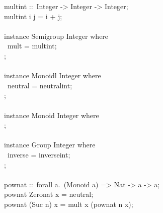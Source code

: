 \begin{isabellebody}
\begin{isamarkuptext}
\hspace*{0pt}mult{}int ::~Integer -> Integer -> Integer;\\
\hspace*{0pt}mult{}int i j = i + j;\\
\hspace*{0pt}\\
\hspace*{0pt}instance Semigroup Integer where {}\\
\hspace*{0pt} ~mult = mult{}int;\\
\hspace*{0pt}{\char125};\\
\hspace*{0pt}\\
\hspace*{0pt}instance Monoidl Integer where {}\\
\hspace*{0pt} ~neutral = neutral{}int;\\
\hspace*{0pt}{\char125};\\
\hspace*{0pt}\\
\hspace*{0pt}instance Monoid Integer where {}\\
\hspace*{0pt}{\char125};\\
\hspace*{0pt}\\
\hspace*{0pt}instance Group Integer where {}\\
\hspace*{0pt} ~inverse = inverse{}int;\\
\hspace*{0pt}{\char125};\\
\hspace*{0pt}\\
\hspace*{0pt}pow{}nat ::~forall a.~(Monoid a) => Nat -> a -> a;\\
\hspace*{0pt}pow{}nat Zero{}nat x = neutral;\\
\hspace*{0pt}pow{}nat (Suc n) x = mult x (pow{}nat n x);\\
\hspace*{0pt}\\

\end{isamarkuptext}
\end{isabellebody}
